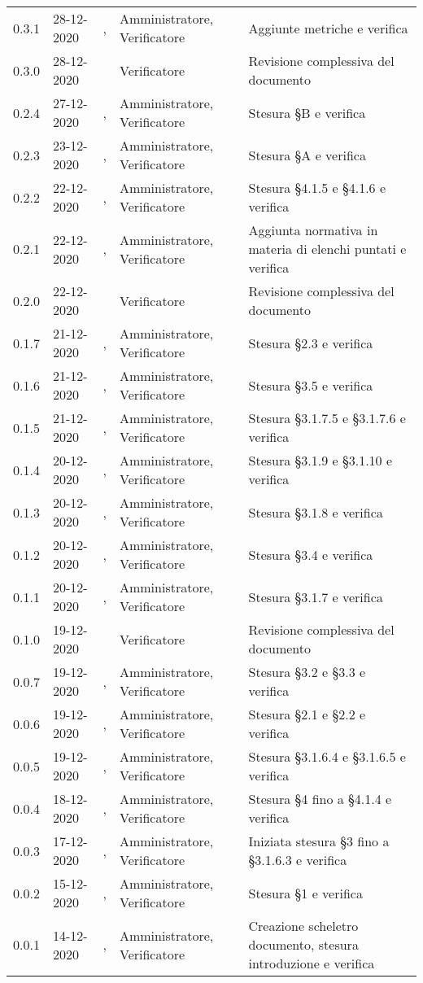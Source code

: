 {\begin{longtable}{C{1.7cm} | C{2.2cm} | C{3.2cm} | C{3cm} | C{4.8cm}}
0.3.1 & 28-12-2020 & \ZM{}, \SP{} & Amministratore, Verificatore & Aggiunte metriche e verifica \\
0.3.0 & 28-12-2020 & \SP{} & Verificatore & Revisione complessiva del documento\\
0.2.4 & 27-12-2020 & \PA{}, \SG{} & Amministratore, Verificatore & Stesura \S B e verifica\\
0.2.3 & 23-12-2020 & \PA{}, \BM{} & Amministratore, Verificatore & Stesura \S A e verifica\\
0.2.2 & 22-12-2020 & \SH{}, \BM{} & Amministratore, Verificatore & Stesura \S 4.1.5 e \S 4.1.6 e verifica\\
0.2.1 & 22-12-2020 & \PA{}, \SG{} & Amministratore, Verificatore & Aggiunta normativa in materia di elenchi puntati e verifica\\
0.2.0 & 22-12-2020 & \SG{} & Verificatore & Revisione complessiva del documento \\
0.1.7 & 21-12-2020 & \ZM{}, \SP{} & Amministratore, Verificatore & Stesura \S 2.3 e verifica \\
0.1.6 & 21-12-2020 & \RA{}, \BM{} & Amministratore, Verificatore & Stesura \S 3.5 e verifica \\
0.1.5 & 21-12-2020 & \PA{}, \BM{} & Amministratore, Verificatore & Stesura \S 3.1.7.5 e \S 3.1.7.6 e verifica \\
0.1.4 & 20-12-2020 & \ZM{}, \SP{} & Amministratore, Verificatore & Stesura \S 3.1.9 e \S 3.1.10 e verifica \\
0.1.3 & 20-12-2020 & \PA{}, \SP{} & Amministratore, Verificatore & Stesura \S 3.1.8 e verifica \\
0.1.2 & 20-12-2020 & \RA{}, \BM{} & Amministratore, Verificatore & Stesura \S 3.4 e verifica \\
0.1.1 & 20-12-2020 & \PA{}, \SP{}  & Amministratore, Verificatore & Stesura \S 3.1.7 e verifica \\
0.1.0 & 19-12-2020 & \SG{} & Verificatore & Revisione complessiva del documento \\
0.0.7 & 19-12-2020 & \RA{}, \SP{} & Amministratore, Verificatore & Stesura \S 3.2 e \S 3.3 e verifica \\
0.0.6 & 19-12-2020 & \ZM{}, \BM{} & Amministratore, Verificatore & Stesura \S 2.1 e \S 2.2 e verifica \\
0.0.5 & 19-12-2020 & \PA{}, \SP{} & Amministratore, Verificatore & Stesura \S 3.1.6.4 e \S 3.1.6.5 e verifica \\
0.0.4 & 18-12-2020 & \SH{}, \SP{} & Amministratore, Verificatore & Stesura \S 4 fino a \S 4.1.4 e verifica\\
0.0.3 & 17-12-2020 & \PA{}, \BM{} & Amministratore, Verificatore & Iniziata stesura \S 3 fino a \S 3.1.6.3 e verifica\\
0.0.2 & 15-12-2020 & \PA{}, \SP{} & Amministratore, Verificatore & Stesura \S 1 e verifica\\
0.0.1 & 14-12-2020 & \ZM{}, \SP{} & Amministratore, Verificatore & Creazione scheletro documento, stesura introduzione e verifica\\
		
\end{longtable}
}
